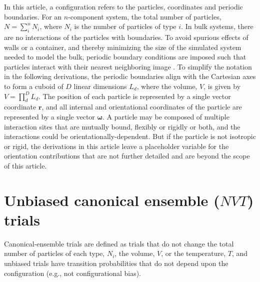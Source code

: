 \documentclass[
  9pt,
  bestpractices,
]{livecoms}
\begin{document}
In this article, a configuration refers to the particles, coordinates and periodic boundaries.
For an $n$-component system, the total number of particles, $N=\sum_{i}^{n} N_i$, where $N_i$ is the number of particles of type $i$.
In bulk systems, there are no interactions of the particles with boundaries.
To avoid spurious effects of walls or a container, and thereby minimizing the size of the simulated system needed to model the bulk, periodic boundary conditions are imposed such that particles interact with their nearest neighboring image \cite{allen_computer_1989}.
To simplify the notation in the following derivations, the periodic boundaries align with the Cartesian axes to form a cuboid of $D$ linear dimensions $L_d$, where the volume, $V$, is given by $V=\prod_d^D L_d$.
The position of each particle is represented by a single vector coordinate $\mathbf{r}$, and all internal and orientational coordinates of the particle are represented by a single vector $\boldsymbol{\omega}$.
A particle may be composed of multiple interaction sites that are mutually bound, flexibly or rigidly or both, and the interactions could be orientationally-dependent.
But if the particle is not isotropic or rigid, the derivations in this article leave a placeholder variable for the orientation contributions that are not further detailed and are beyond the scope of this article.

\section{\label{sec:rhs_nvt}Unbiased canonical ensemble ($NVT$) trials}

Canonical-ensemble trials are defined as trials that do not change the total number of particles of each type, $N_i$, the volume, $V$, or the temperature, $T$, and unbiased trials have transition probabilities that do not depend upon the configuration (e.g., not configurational bias).
\end{document}
